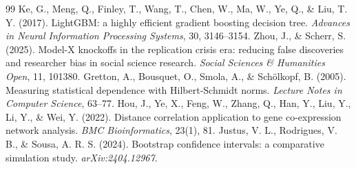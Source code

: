 \documentclass[11pt]{article}
\begin{document}
\begin{thebibliography}{99}
 Ke, G., Meng, Q., Finley, T., Wang, T., Chen, W., Ma, W., Ye, Q., \& Liu, T. Y. (2017). LightGBM: a highly efficient gradient boosting decision tree. \textit{Advances in Neural Information Processing Systems}, 30, 3146--3154.
 Zhou, J., \& Scherr, S. (2025). Model-X knockoffs in the replication crisis era: reducing false discoveries and researcher bias in social science research. \textit{Social Sciences \& Humanities Open}, 11, 101380.
 Gretton, A., Bousquet, O., Smola, A., \& Sch\"olkopf, B. (2005). Measuring statistical dependence with Hilbert-Schmidt norms. \textit{Lecture Notes in Computer Science}, 63--77.
 Hou, J., Ye, X., Feng, W., Zhang, Q., Han, Y., Liu, Y., Li, Y., \& Wei, Y. (2022). Distance correlation application to gene co-expression network analysis. \textit{BMC Bioinformatics}, 23(1), 81.
 Justus, V. L., Rodrigues, V. B., \& Sousa, A. R. S. (2024). Bootstrap confidence intervals: a comparative simulation study. \textit{arXiv:2404.12967}.
\end{thebibliography}
\end{document}
